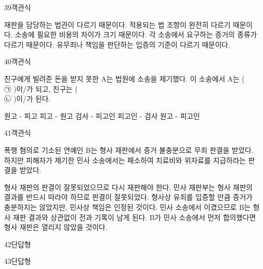 \documentclass[fs9,seriesRus]{korfarm-base}
\begin{document}
\begin{kfQBlock}{39}{객관식}
\begin{kfChoices}
\kfChoice 재판을 담당하는 법관이 다르기 때문이다.
\kfChoice 적용되는 법 조항이 완전히 다르기 때문이다.
\kfChoice 소송에 필요한 비용의 차이가 크기 때문이다.
\kfChoice 각 소송에서 요구하는 증거의 종류가 다르기 때문이다.
\kfChoice 유무죄나 책임을 판단하는 입증의 기준이 다르기 때문이다.
\end{kfChoices}
\end{kfQBlock}
\begin{kfQBlock}{40}{객관식}
\begin{kfEvidence}친구에게 빌려준 돈을 받지 못한 A는 법원에 소송을 제기했다. 이 소송에서 A는 ( \\\relax
㉠ )이/가 되고, 친구는 ( \\\relax
㉡ )이/가 된다.\end{kfEvidence}
\begin{kfChoices}
\kfChoice 원고 - 피고
\kfChoice 피고 - 원고
\kfChoice 검사 - 피고인
\kfChoice 피고인 - 검사
\kfChoice 원고 - 피고인
\end{kfChoices}
\end{kfQBlock}
\begin{kfQBlock}{41}{객관식}
\begin{kfEvidence}폭행 혐의로 기소된 연예인 B는 형사 재판에서 증거 불충분으로 무죄 판결을 받았다. 하지만 피해자가 제기한 민사 소송에서는 패소하여 치료비와 위자료를 지급하라는 판결을 받았다.\end{kfEvidence}
\begin{kfChoices}
\kfChoice 형사 재판의 판결이 잘못되었으므로 다시 재판해야 한다.
\kfChoice 민사 재판부는 형사 재판의 결과를 반드시 따라야 하므로 판결이 잘못되었다.
\kfChoice 형사상 유죄를 입증할 만큼 증거가 충분하지는 않았지만, 민사상 책임은 인정된 것이다.
\kfChoice 민사 소송에서 이겼으므로 B는 형사 재판 결과와 상관없이 전과 기록이 남게 된다.
\kfChoice B가 민사 소송에서 먼저 합의했다면 형사 재판은 열리지 않았을 것이다.
\end{kfChoices}
\end{kfQBlock}
\begin{kfQBlock}{42}{단답형}
\end{kfQBlock}
\begin{kfQBlock}{43}{단답형}
\end{kfQBlock}
\end{document}

